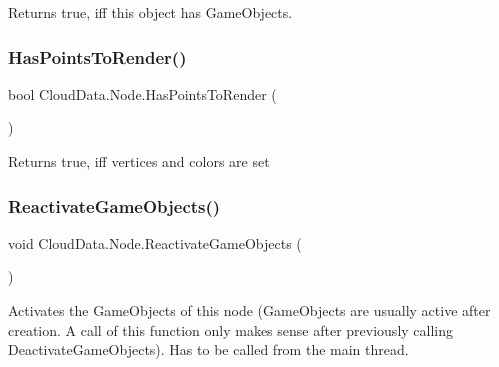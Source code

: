Returns true, iff this object has Game\+Objects. 

\mbox{\label{class_cloud_data_1_1_node_add8b3fc44e4abc6572f7a723deda352d}} 
\subsubsection{\texorpdfstring{Has\+Points\+To\+Render()}{HasPointsToRender()}}
{\footnotesize\ttfamily bool Cloud\+Data.\+Node.\+Has\+Points\+To\+Render (\begin{DoxyParamCaption}{ }\end{DoxyParamCaption})\hspace{0.3cm}{\ttfamily [inline]}}



Returns true, iff vertices and colors are set 

\mbox{\label{class_cloud_data_1_1_node_a8a7c01462a603882108e401c8119e388}} 
\subsubsection{\texorpdfstring{Reactivate\+Game\+Objects()}{ReactivateGameObjects()}}
{\footnotesize\ttfamily void Cloud\+Data.\+Node.\+Reactivate\+Game\+Objects (\begin{DoxyParamCaption}{ }\end{DoxyParamCaption})\hspace{0.3cm}{\ttfamily [inline]}}



Activates the Game\+Objects of this node (Game\+Objects are usually active after creation. A call of this function only makes sense after previously calling Deactivate\+Game\+Objects). Has to be called from the main thread. 

\mbox{\label{class_cloud_data_1_1_node_a98647399470b2adc5c6ac27ca78c5ddb}} 
